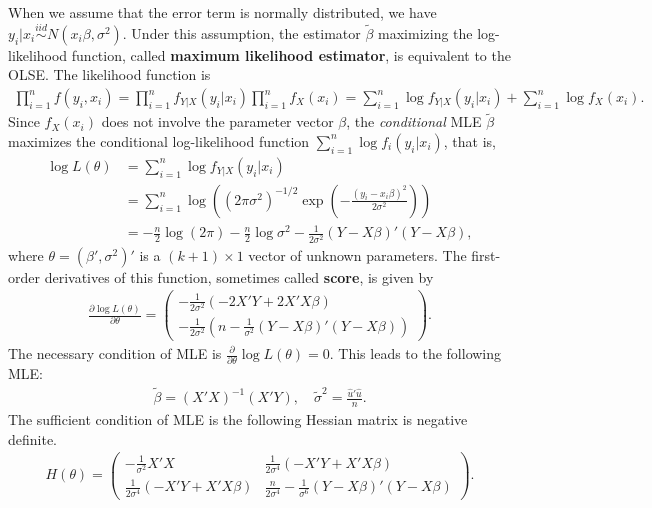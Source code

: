 \documentclass[
  12pt,
]{article}
\begin{document}
When we assume that the error term is normally distributed, we have
\(y_i | x_i \overset{iid}{\sim} N(x_i \beta, \sigma^2)\). Under this
assumption, the estimator \(\tilde{\beta}\) maximizing the
log-likelihood function, called \textbf{maximum likelihood estimator},
is equivalent to the OLSE. The likelihood function is \begin{align*}
  \prod_{i=1}^n f(y_i, x_i)
  = \prod_{i=1}^n f_{Y|X}(y_i | x_i) \prod_{i=1}^n f_X(x_i)
  = \sum_{i=1}^n \log f_{Y|X}(y_i | x_i) + \sum_{i=1}^n \log f_X(x_i).
\end{align*} Since \(f_X(x_i)\) does not involve the parameter vector
\(\beta\), the \emph{conditional} MLE \(\tilde{\beta}\) maximizes the
conditional log-likelihood function
\(\sum_{i=1}^n \log f_i(y_i | x_i)\), that is, \begin{align*}
  \log L(\theta) 
  &= \sum_{i=1}^n \log f_{Y|X}(y_i | x_i)  \\
  &= \sum_{i=1}^n \log \left( (2\pi\sigma^2)^{-1/2} \exp\left( -\frac{(y_i - x_i \beta)^2}{2\sigma^2} \right) \right)  \\
  &= -\frac{n}{2} \log (2\pi) -\frac{n}{2}\log\sigma^2 -\frac{1}{2\sigma^2} (Y - X \beta)'(Y - X \beta),
\end{align*} where \(\theta = (\beta', \sigma^2)'\) is a
\((k + 1) \times 1\) vector of unknown parameters. The first-order
derivatives of this function, sometimes called \textbf{score}, is given
by \begin{align*}
  \frac{\partial \log L(\theta)}{\partial \theta} =
  \begin{pmatrix}
    -\frac{1}{2\sigma^2} (-2X'Y + 2X'X \beta) \\
    -\frac{1}{2\sigma^2} \left(n - \frac{1}{\sigma^2} (Y - X \beta)'(Y - X \beta) \right)
  \end{pmatrix}.
\end{align*} The necessary condition of MLE is
\(\frac{\partial}{\partial \theta} \log L(\theta) = 0\). This leads to
the following MLE: \begin{align*}
  \tilde{\beta} = (X'X)^{-1}(X'Y),\quad \tilde{\sigma}^2 = \frac{\hat{u}'\hat{u}}{n}.
\end{align*} The sufficient condition of MLE is the following Hessian
matrix is negative definite. \begin{align*}
  H(\theta) =
  \begin{pmatrix}
    -\frac{1}{\sigma^2} X'X  & \frac{1}{2\sigma^4} (-X'Y + X'X \beta) \\
    \frac{1}{2\sigma^4} (-X'Y + X'X \beta) & \frac{n}{2\sigma^4} - \frac{1}{\sigma^6} (Y - X \beta)'(Y - X \beta)
  \end{pmatrix}.
\end{align*}
\end{document}
